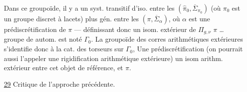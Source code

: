 

Dans ce groupoïde, il y a un syst. transitif d'iso. entre les  $(\widehat{\pi}_0,\overline{\Sigma}_{\pi_0})$ (où $\pi_0$ est un groupe discret à lacets) plus gén. entre les $(\pi,\overline{\Sigma}_\alpha)$, où $\alpha$  est une prédiscrétification de $\pi$ --- définissant donc un isom.  extérieur de $\Pi_{g,\nu}$
$\pi$ \ldots\  groupe de  autom. est noté $\Gamma_0$. La  groupoïde des corres  arithmétiques extérieures s'identifie donc à la cat. des torseurs sur $\Gamma_0$,
Une prédiscrétification (on pourrait aussi l'appeler une rigidification arithmétique extérieure)  un isom arithm. extérieur entre cet objet de référence, et $\pi$.


\uline{29} Critique de l'approche précédente.


